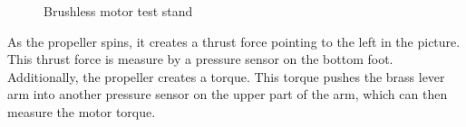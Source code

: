 \documentclass{article}
\numberwithin{equation}{section} %
\begin{document}
\begin{figure}[ht]
\centering
{}
\caption[Optional caption for list of figures]{Brushless motor test stand}
\end{figure}

As the propeller spins, it creates a thrust force pointing to the left in the picture. This thrust force is measure by a pressure sensor on the bottom foot. Additionally, the propeller creates a torque. This torque pushes the brass lever arm into another pressure sensor on the upper part of the arm, which can then measure the motor torque.
\end{document}

